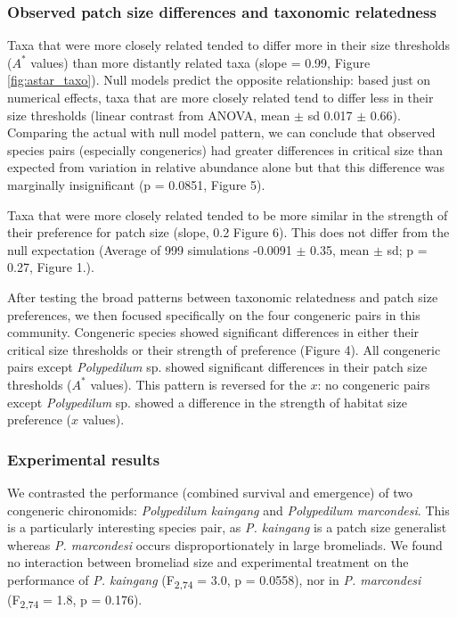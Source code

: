 \subsubsection{Observed patch size differences and taxonomic
relatedness}\label{observed-habitat-size-differences-and-taxonomic-relatedness}

Taxa that were more closely related tended to differ more in their size
thresholds (\(A^{*}\) values) than more distantly related taxa (slope =
0.99, Figure \ref{fig:astar_taxo}). Null models predict the opposite relationship: based
just on numerical effects, taxa that are more closely related tend to
differ less in their size thresholds (linear contrast from ANOVA, mean $\pm$
sd 0.017 $\pm$ 0.66). Comparing the actual with null model pattern, we can
conclude that observed species pairs (especially congenerics) had
greater differences in critical size than expected from variation in
relative abundance alone but that this difference was marginally
insignificant (p = 0.0851, Figure 5).

Taxa that were more closely related tended to be more similar in the
strength of their preference for patch size (slope, 0.2 Figure 6).
This does not differ from the null expectation (Average of 999
simulations -0.0091 $\pm$ 0.35, mean $\pm$ sd; p =
0.27, Figure 1.).

After testing the broad patterns between taxonomic relatedness and
patch size preferences, we then focused specifically on the four
congeneric pairs in this community. Congeneric species showed
significant differences in either their critical size thresholds or
their strength of preference (Figure 4). All congeneric pairs except
\emph{Polypedilum} sp. showed significant differences in their patch
size thresholds (\(A^{*}\) values). This pattern is reversed for the
$x$: no congeneric pairs except
\emph{Polypedilum} sp. showed a difference in the strength of habitat
size preference (\(x\) values).

\subsubsection{Experimental results}\label{experimental-results}

We contrasted the performance (combined survival and emergence) of two
congeneric chironomids: \emph{Polypedilum kaingang} and
\emph{Polypedilum marcondesi}. This is a particularly interesting
species pair, as \emph{P. kaingang} is a patch size generalist whereas
\emph{P. marcondesi} occurs disproportionately in large bromeliads. We
found no interaction between bromeliad size and experimental treatment
on the performance of \emph{P. kaingang} (F\textsubscript{2,74} = 3.0, p
= 0.0558), nor in \emph{P. marcondesi} (F\textsubscript{2,74} = 1.8, p =
0.176).

